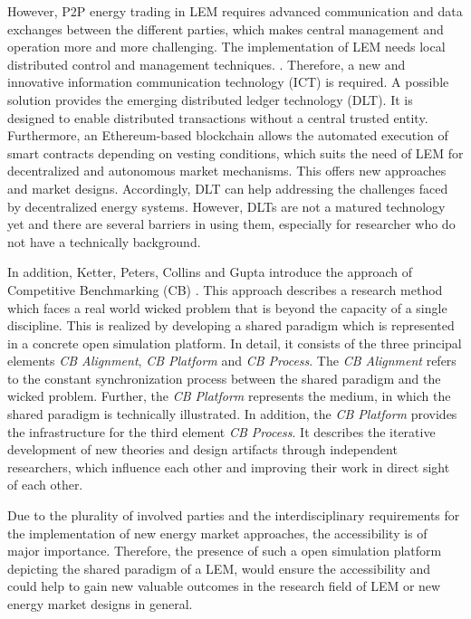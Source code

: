However, P2P energy trading in LEM requires advanced communication and data exchanges between the different parties, which makes central management and operation more and more challenging. The implementation of LEM needs local distributed control and management techniques. . Therefore, a new and innovative information communication technology (ICT) is required.  A possible solution provides the emerging distributed ledger technology (DLT). It is designed to enable distributed transactions without a central trusted entity. Furthermore, an Ethereum-based blockchain allows the automated execution of smart contracts depending on vesting conditions, which suits the need of LEM for decentralized and autonomous market mechanisms. This offers new approaches and market designs. Accordingly, DLT can help addressing the challenges faced by decentralized energy systems. However, DLTs are not a matured technology yet and there are several barriers in using them, especially for researcher who do not have a technically background. 

In addition, Ketter, Peters, Collins and Gupta introduce the approach of Competitive Benchmarking (CB) . This approach describes a research method which faces a real world wicked problem that is beyond the capacity of a single discipline. This is realized by developing a shared paradigm which is represented in a concrete open simulation platform. In detail, it consists of the three principal elements \textit{CB Alignment}, \textit{CB Platform} and \textit{CB Process}. The \textit{CB Alignment} refers to the constant synchronization process between the shared paradigm and the wicked problem. Further, the \textit{CB Platform} represents the medium, in which the shared paradigm is technically illustrated. In addition, the \textit{CB Platform} provides the infrastructure for the third element \textit{CB Process}. It describes the iterative development of new theories and design artifacts through independent researchers, which influence each other and improving their work in direct sight of each other. 

Due to the plurality of involved parties and the interdisciplinary requirements for the implementation of new energy market approaches, the accessibility is of major importance.
Therefore, the presence of such a open simulation platform depicting the shared paradigm of a LEM, would ensure the accessibility and could help to gain new valuable outcomes in the research field of LEM or new energy market designs in general. 

